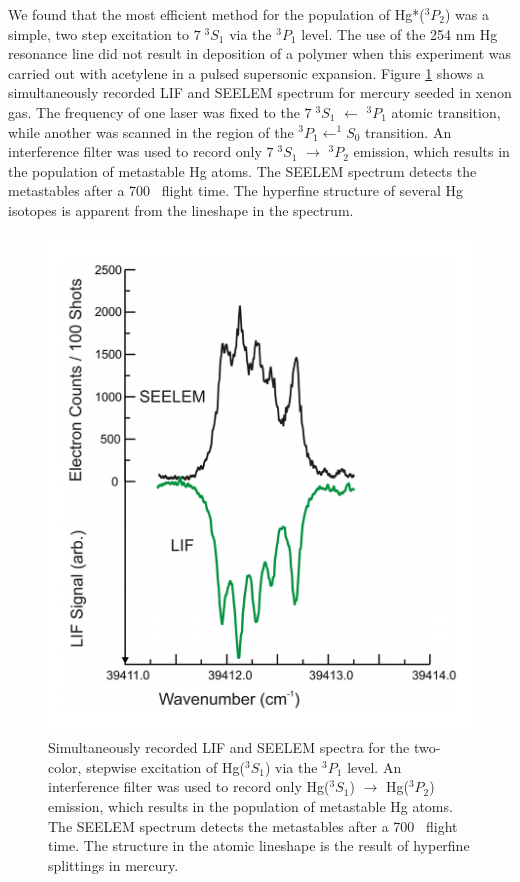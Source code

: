 We found that the most efficient method for the population of
Hg*($^3P_2$) was a simple, two step excitation to $7 \; ^3S_1$ via the
$^3P_1$ level.  The use of the 254 nm Hg resonance line did not result
in deposition of a polymer when this experiment was carried out with
acetylene in a pulsed supersonic expansion.  Figure
\ref{fig:hg-twostep} shows a simultaneously recorded LIF and SEELEM
spectrum for mercury seeded in xenon gas.  The frequency of one laser
was fixed to the $7 \; ^3S_1$ $\leftarrow$ $^3P_1$ atomic transition,
while another was scanned in the region of the $^3P_1 \leftarrow
^1S_0$ transition.  An interference filter was used to record only $7
\; ^3S_1$ $\rightarrow$ $^3P_2$ emission, which results in the
population of metastable Hg atoms.  The SEELEM spectrum detects the
metastables after a 700 \microsec\ flight time.  The hyperfine
structure of several Hg isotopes is apparent from the lineshape in the
spectrum.

\begin{figure}
  \caption{Simultaneously recorded LIF and SEELEM spectra for the
    two-color, stepwise excitation of Hg($^3S_1$) via the $^3P_1$
    level.  An interference filter was used to record only Hg($^3S_1$)
    $\rightarrow$ Hg($^3P_2$) emission, which results in the
    population of metastable Hg atoms.  The SEELEM spectrum detects
    the metastables after a 700 \microsec\ flight time.  The structure
    in the atomic lineshape is the result of hyperfine splittings in
    mercury.}
  \label{fig:hg-twostep}
  \centering
  \includegraphics[width=6.5in]{hg-twostep.pdf}
\end{figure}

